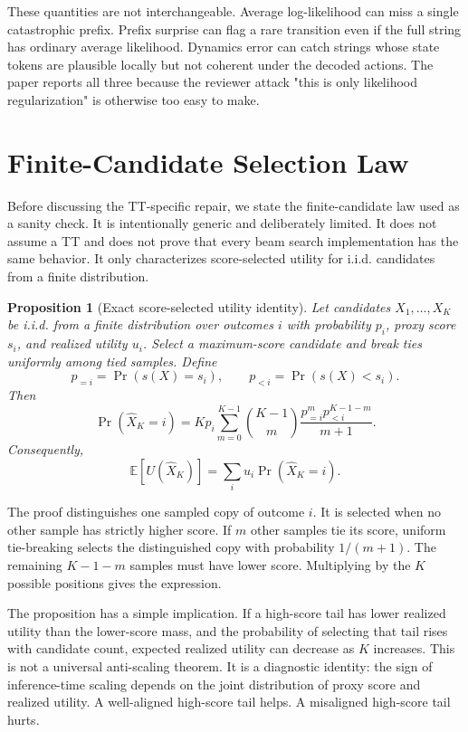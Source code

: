 \documentclass{article}
\newtheorem{proposition}{Proposition}
\newcommand{\utility}{U}
\begin{document}
These quantities are not interchangeable. Average log-likelihood can miss a single catastrophic prefix. Prefix surprise can flag a rare transition even if the full string has ordinary average likelihood. Dynamics error can catch strings whose state tokens are plausible locally but not coherent under the decoded actions. The paper reports all three because the reviewer attack "this is only likelihood regularization" is otherwise too easy to make.

\section{Finite-Candidate Selection Law}

Before discussing the TT-specific repair, we state the finite-candidate law used as a sanity check. It is intentionally generic and deliberately limited. It does not assume a TT and does not prove that every beam search implementation has the same behavior. It only characterizes score-selected utility for i.i.d. candidates from a finite distribution.

\begin{proposition}[Exact score-selected utility identity]
Let candidates \(X_1,\dots,X_K\) be i.i.d. from a finite distribution over outcomes \(i\) with probability \(p_i\), proxy score \(s_i\), and realized utility \(u_i\). Select a maximum-score candidate and break ties uniformly among tied samples. Define
\[
p_{=i}=\Pr(s(X)=s_i),\qquad p_{<i}=\Pr(s(X)<s_i).
\]
Then
\[
\Pr(\hat X_K=i)
=
Kp_i\sum_{m=0}^{K-1}
\binom{K-1}{m}
\frac{p_{=i}^{m}p_{<i}^{K-1-m}}{m+1}.
\]
Consequently,
\[
\mathbb E[\utility(\hat X_K)]=\sum_i u_i\Pr(\hat X_K=i).
\]
\end{proposition}

The proof distinguishes one sampled copy of outcome \(i\). It is selected when no other sample has strictly higher score. If \(m\) other samples tie its score, uniform tie-breaking selects the distinguished copy with probability \(1/(m+1)\). The remaining \(K-1-m\) samples must have lower score. Multiplying by the \(K\) possible positions gives the expression.

The proposition has a simple implication. If a high-score tail has lower realized utility than the lower-score mass, and the probability of selecting that tail rises with candidate count, expected realized utility can decrease as \(K\) increases. This is not a universal anti-scaling theorem. It is a diagnostic identity: the sign of inference-time scaling depends on the joint distribution of proxy score and realized utility. A well-aligned high-score tail helps. A misaligned high-score tail hurts.
\end{document}
